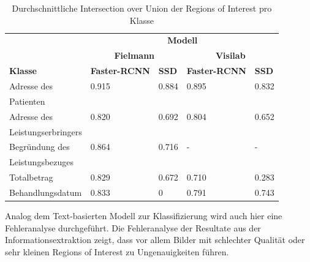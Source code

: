 \begin{table}[h!]
    \centering
    \captionsetup{width=.9\linewidth}
    \caption{Durchschnittliche Intersection over Union der Regions of Interest pro Klasse}
    \label{tab:specific-ie-iou}
    \begin{tabular}{|l|l|l|l|l|}
    \hhline{~|----|}    
    \multicolumn{1}{c|}{}
                                    & \multicolumn{4}{c|}{\cellcolor[HTML]{C0E5FD}\textbf{Modell}}  \\
    \hhline{~|--|--|}
    \multicolumn{1}{c|}{}
                                    & \multicolumn{2}{c|}{\cellcolor[HTML]{C0E5FD}\textbf{Fielmann}} 
                                                            & \multicolumn{2}{c|}{\cellcolor[HTML]{C0E5FD}\textbf{Visilab}} \\
    \hline
    \rowcolor[HTML]{C0E5FD}     
    \textbf{Klasse}                 & \textbf{Faster-RCNN}  & \textbf{SSD}        & \textbf{Faster-RCNN}  & \textbf{SSD} \\
    \hline
    Adresse des                     & 0.915    & 0.884      & 0.895 & 0.832 \\
    Patienten &&&& \\
    \hline
    Adresse des                     & 0.820    & 0.692      & 0.804 & 0.652 \\
    Leistungserbringers &&&& \\
    \hline
    Begründung des                  & 0.864    & 0.716      & - & - \\
    Leistungsbezuges &&&& \\
    \hline
    Totalbetrag                     & 0.829    & 0.672      & 0.710 & 0.283 \\
    \hline
    Behandlungsdatum                & 0.833    & 0          & 0.791 & 0.743 \\
    \hline
    \end{tabular}
\end{table}

Analog dem Text-basierten Modell zur Klassifizierung wird auch hier eine Fehleranalyse durchgeführt. Die Fehleranalyse der Resultate aus der Informationsextraktion zeigt, dass vor allem Bilder mit schlechter Qualität oder sehr kleinen Regions of Interest zu Ungenauigkeiten führen.

